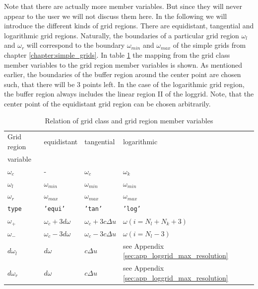 Note that there are actually more member variables. But since they will never appear to the user we will not discuss them here. In the following we will introduce the different kinds of grid regions. There are equidistant, tangential and logarithmic grid regions. Naturally, the boundaries of a particular grid region $\omega_l$ and $\omega_r$ will correspond to the boundary $\omega_{min}$ and $\omega_{max}$ of the simple grids from chapter \ref{chapter:simple_grids}. In table \ref{tab:grid_region_types} the mapping from the grid class member variables to the grid region member variables is shown. As mentioned earlier, the boundaries of the buffer region around the center point are chosen such, that there will be 3 points left. In the case of the logarithmic grid region, the buffer region always includes the linear region II of the loggrid. Note, that the center point of the equidistant grid region can be chosen arbitrarily.
\begin{table}[h]
	\begin{center}
		\begin{tabular}{llll}
		Grid region & equidistant & tangential & logarithmic  \\ 
		variable    &             &            &              \\
		\hline 
		$\omega_c$    & -               & $\omega_c$     & $\omega_k$     \\
		$\omega_l$    & $\omega_{min}$  & $\omega_{min}$ & $\omega_{min}$ \\
		$\omega_r$    & $\omega_{max}$  & $\omega_{max}$ & $\omega_{max}$ \\
		\texttt{type} & \texttt{'equi'} & \texttt{'tan'} & \texttt{'log'} \\
		$\omega_+$         & $\omega_c+3d\omega$ & $\omega_c+3c\Delta u$ & $\omega(i=N_l+N_k+3)$ \\
		$\omega_-$         & $\omega_c-3d\omega$ & $\omega_c-3c\Delta u$ & $\omega(i=N_l-3)$  \\
		$d\omega_l$  & $d\omega$ & $c\Delta u$ & see Appendix \ref{sec:app_loggrid_max_resolution} \\
		$d\omega_r$  & $d\omega$ & $c\Delta u$ & see Appendix \ref{sec:app_loggrid_max_resolution} \\
		\end{tabular}
	\end{center}
	\caption{Relation of grid class and grid region member variables}
	\label{tab:grid_region_types}
\end{table}

